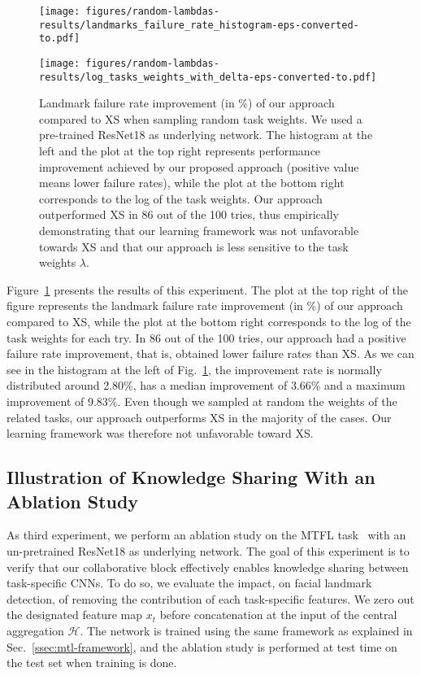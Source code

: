 \documentclass[runningheads]{llncs}
\newcommand{\citep}{\cite}
\begin{document}
\begin{figure}[t]
    \centering
    \begin{minipage}{0.49\linewidth}
        \texttt{[image: figures/random-lambdas-results/landmarks\_failure\_rate\_histogram-eps-converted-to.pdf]}
    \end{minipage}
    \begin{minipage}{0.49\linewidth}
        \texttt{[image: figures/random-lambdas-results/log\_tasks\_weights\_with\_delta-eps-converted-to.pdf]}
    \end{minipage}
    \caption{Landmark failure rate improvement (in \%) of our approach compared to XS when sampling random task weights. We used a pre-trained ResNet18 as underlying network. The histogram at the left and the plot at the top right represents performance improvement achieved by our proposed approach (positive value means lower failure rates), while the plot at the bottom right corresponds to the log of the task weights. Our approach outperformed XS in 86 out of the 100 tries, thus empirically demonstrating that our learning framework was not unfavorable towards XS and that our approach is less sensitive to the task weights $\lambda$.}
    \label{fig:aflw-random-task-weights}
\end{figure}

Figure~\ref{fig:aflw-random-task-weights} presents the results of this experiment. The plot at the top right of the figure represents the landmark failure rate improvement (in \%) of our approach compared to XS, while the plot at the bottom right corresponds to the log of the task weights for each try. In 86 out of the 100 tries, our approach had a positive failure rate improvement, that is, obtained lower failure rates than XS. As we can see in the histogram at the left of Fig.~\ref{fig:aflw-random-task-weights}, the improvement rate is normally distributed around 2.80\%, has a median improvement of 3.66\% and a maximum improvement of 9.83\%. Even though we sampled at random the weights of the related tasks, our approach outperforms XS in the majority of the cases. Our learning framework was therefore not unfavorable toward XS.


\subsection{Illustration of Knowledge Sharing With an Ablation Study}
\label{ssec:task-relevance}

As third experiment, we perform an ablation study on the MTFL task~\citep{zhang2014facial} with an un-pretrained ResNet18 as underlying network. The goal of this experiment is to verify that our collaborative block effectively enables knowledge sharing between task-specific CNNs. To do so, we evaluate the impact, on facial landmark detection, of removing the contribution of each task-specific features. We zero out the designated feature map $x_t$ before concatenation at the input of the central aggregation $\mathcal{H}$. The network is trained using the same framework as explained in Sec.~\ref{ssec:mtl-framework}, and the ablation study is performed at test time on the test set when training is done.
\end{document}
